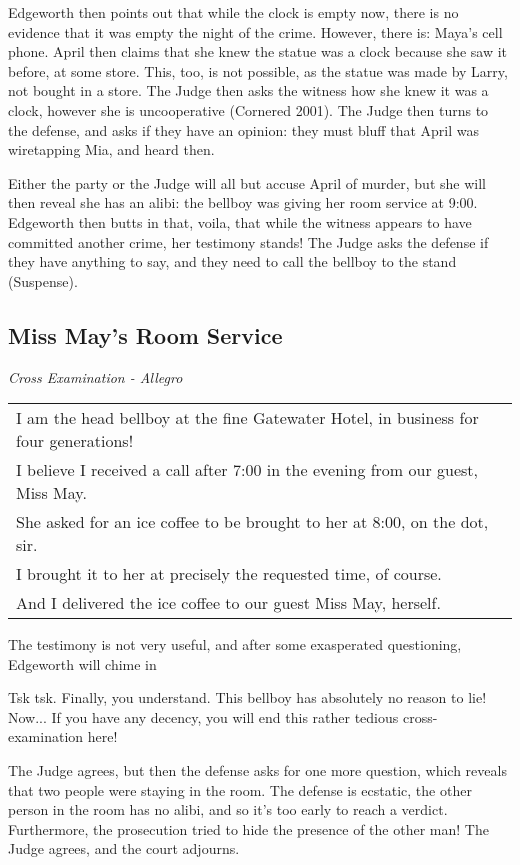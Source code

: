 Edgeworth then points out that while the clock is empty now, there is no evidence that it was empty the night of the crime. However, there is: Maya's cell phone. April then claims that she knew the statue was a clock because she saw it before, at some store. This, too, is not possible, as the statue was made by Larry, not bought in a store. The Judge then asks the witness how she knew it was a clock, however she is uncooperative (Cornered 2001). The Judge then turns to the defense, and asks if they have an opinion: they must bluff that April was wiretapping Mia, and heard then.

Either the party or the Judge will all but accuse April of murder, but she will then reveal she has an alibi: the bellboy was giving her room service at 9:00. Edgeworth then butts in that, voila, that while the witness appears to have committed another crime, her testimony stands! The Judge asks the defense if they have anything to say, and they need to call the bellboy to the stand (Suspense).

\subsection{Miss May's Room Service}
\textit{Cross Examination - Allegro}\\
\begin{tabular}{p{11cm}}
I am the head bellboy at the fine Gatewater Hotel, in business for four generations!\\
I believe I received a call after 7:00 in the evening from our guest, Miss May.\\
She asked for an ice coffee to be brought to her at 8:00, on the dot, sir.\\
I brought it to her at precisely the requested time, of course.\\
And I delivered the ice coffee to our guest Miss May, herself. \end{tabular}

The testimony is not very useful, and after some exasperated questioning, Edgeworth will chime in 
\begin{center}
Tsk tsk. Finally, you understand. This bellboy has absolutely no reason to lie! Now... If you have any decency, you will end this rather tedious cross-examination here! 
\end{center}

The Judge agrees, but then the defense asks for one more question, which reveals that two people were staying in the room. The defense is ecstatic, the other person in the room has no alibi, and so it's too early to reach a verdict. Furthermore, the prosecution tried to hide the presence of the other man! The Judge agrees, and the court adjourns.

